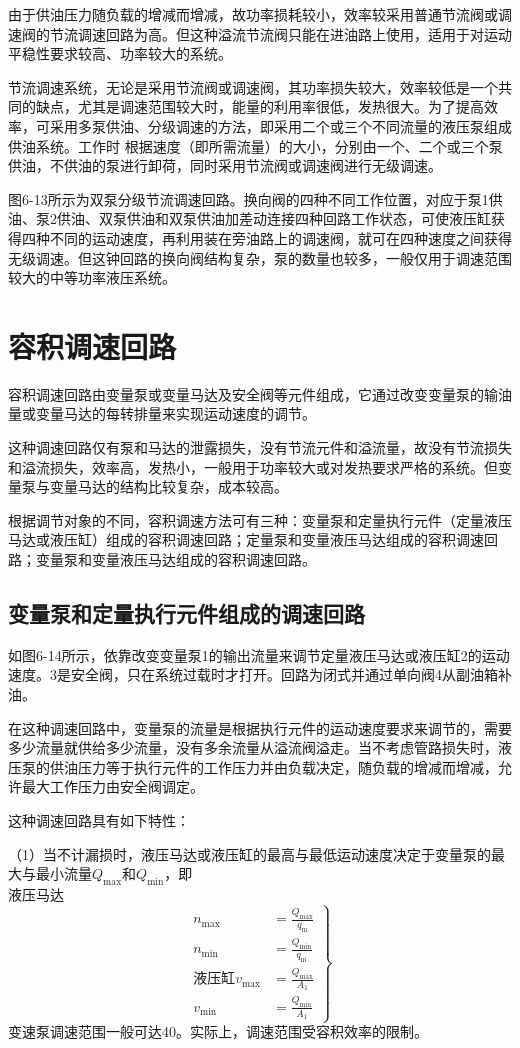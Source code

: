 由于供油压力随负载的增减而增减，故功率损耗较小，效率较采用普通节流阀或调速阀的节流调速回路为高。但这种溢流节流阀只能在进油路上使用，适用于对运动平稳性要求较高、功率较大的系统。

节流调速系统，无论是采用节流阀或调速阀，其功率损失较大，效率较低是一个共同的缺点，尤其是调速范围较大时，能量的利用率很低，发热很大。为了提高效率，可采用多泵供油、分级调速的方法，即采用二个或三个不同流量的液压泵组成供油系统。工作时 根据速度（即所需流量）的大小，分别由一个、二个或三个泵供油，不供油的泵进行卸荷，同时采用节流阀或调速阀进行无级调速。

图6-13所示为双泵分级节流调速回路。换向阀的四种不同工作位置，对应于泵1供油、泵2供油、双泵供油和双泵供油加差动连接四种回路工作状态，可使液压缸获得四种不同的运动速度，再利用装在旁油路上的调速阀，就可在四种速度之间获得无级调速。但这钟回路的换向阀结构复杂，泵的数量也较多，一般仅用于调速范围较大的中等功率液压系统。
\section{容积调速回路}
容积调速回路由变量泵或变量马达及安全阀等元件组成，它通过改变变量泵的输油量或变量马达的每转排量来实现运动速度的调节。

这种调速回路仅有泵和马达的泄露损失，没有节流元件和溢流量，故没有节流损失和溢流损失，效率高，发热小，一般用于功率较大或对发热要求严格的系统。但变量泵与变量马达的结构比较复杂，成本较高。

根据调节对象的不同，容积调速方法可有三种：变量泵和定量执行元件（定量液压马达或液压缸）组成的容积调速回路；定量泵和变量液压马达组成的容积调速回路；变量泵和变量液压马达组成的容积调速回路。
\subsection{变量泵和定量执行元件组成的调速回路}
如图6-14所示，依靠改变变量泵1的输出流量来调节定量液压马达或液压缸2的运动速度。3是安全阀，只在系统过载时才打开。回路为闭式并通过单向阀4从副油箱补油。

在这种调速回路中，变量泵的流量是根据执行元件的运动速度要求来调节的，需要多少流量就供给多少流量，没有多余流量从溢流阀溢走。当不考虑管路损失时，液压泵的供油压力等于执行元件的工作压力并由负载决定，随负载的增减而增减，允许最大工作压力由安全阀调定。

这种调速回路具有如下特性：

（1）当不计漏损时，液压马达或液压缸的最高与最低运动速度决定于变量泵的最大与最小流量$Q_\text{max}$和$Q_\text{min}$，即\\
液压马达
\begin{equation}
\left.
\begin{aligned}
n_\text{max}&=\frac{Q_\text{max}}{q_\text{m}}\\
n_\text{min}&=\frac{Q_\text{min}}{q_\text{m}}\\
\text{液压缸}
v_\text{max}&=\frac{Q_\text{max}}{A_\text{1}}\\
v_\text{min}&=\frac{Q_\text{min}}{A_\text{1}}
\end{aligned}
\right\}
\end{equation}
变速泵调速范围一般可达40。实际上，调速范围受容积效率的限制。


